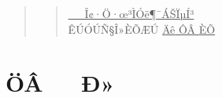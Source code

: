 \documentclass[12pt,openany,CJK,oneside]{cctbook}
\begin{document}
\begin{titlepage}
\begin{quote}
\begin{quote}
{               \underline{\hspace{0.4cm} \kaishu \ \ \ Î¢·Ö·œ³ÌÓë¶¯ÁŠÏµÍ³ \hspace{1.1cm}}
       \\
               \vspace{0.9cm}    {\fangsong \hspace{0.45cm} ÊÚÓÚÑ§Î»ÈÕÆÚ}
               \underline{\hspace{1.8cm}  {\fangsong Äê}    \hspace{1.21cm} {\fangsong ÔÂ}  \hspace{1.21cm} {\fangsong ÈÕ}\hspace{0.4cm}}}
\end{quote}
 \end{quote}
\end{titlepage}
\setlength{\evensidemargin}{0.88cm}
\setlength{\oddsidemargin}{0.88cm}
\parskip 10pt
\baselineskip 20pt
\vspace{1.2cm}

\chapter*{\heiti ÖÂ\ \ \ Ð» }
\end{document}
